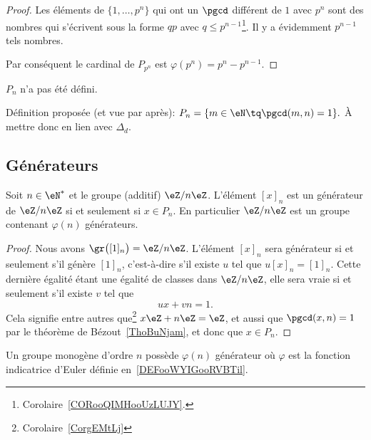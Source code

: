 \begin{proof}
    Les éléments de \( \{ 1,\ldots,p^n \}\) qui ont un \( \pgcd\) différent de \( 1\) avec \( p^n\) sont des nombres qui s'écrivent sous la forme \( qp\) avec \( q\leq p^{n-1}\)\footnote{Corolaire~\ref{CORooQIMHooUzLUJY}.}. Il y a évidemment \( p^{n-1}\) tels nombres.

    Par conséquent le cardinal de \( P_{p^n}\) est \( \varphi(p^{n})=p^n-p^{n-1}\).
\end{proof}

\begin{probleme}
    $P_n$ n'a pas été défini.

    Définition proposée (et vue par après): \( P_n = \{ m \in \eN \tq \pgcd(m,n) = 1 \}. \) À mettre donc en lien avec $\Delta_d$.
\end{probleme}

\subsection{Générateurs}

\begin{proposition}     \label{PropZnmuphiGensn}
    Soit \( n\in\eN^*\) et le groupe (additif) \( \eZ/n\eZ\). L'élément \( [x]_n\) est un générateur de \( \eZ/n\eZ\) si et seulement si \( x\in P_n\). En particulier \( \eZ/n\eZ\) est un groupe contenant \( \varphi(n)\) générateurs.
\end{proposition}

\begin{proof}
    Nous avons \( \gr\big( [1]_n \big)=\eZ/n\eZ\). L'élément \( [x]_n\) sera générateur si et seulement s'il génère \( [1]_n \), c'est-à-dire s'il existe \( u\) tel que \( u[x]_n=[1]_n\). Cette dernière égalité étant une égalité de classes dans \( \eZ/n\eZ\), elle sera vraie si et seulement s'il existe \( v\) tel que
    \begin{equation}
        ux+vn=1.
    \end{equation}
    Cela signifie entre autres que\footnote{Corolaire~\ref{CorgEMtLj}} \( x\eZ+n\eZ=\eZ\), et aussi que \( \pgcd(x,n)=1\) par le théorème de Bézout~\ref{ThoBuNjam}, et donc que \( x\in P_n\).
\end{proof}

\begin{corollary}\label{CORooMBLSooMHKmAq}
    Un groupe monogène d'ordre \( n\) possède \( \varphi(n)\) générateur où \( \varphi\) est la fonction indicatrice d'Euler définie en~\ref{DEFooWYIGooRVBTil}.
\end{corollary}

